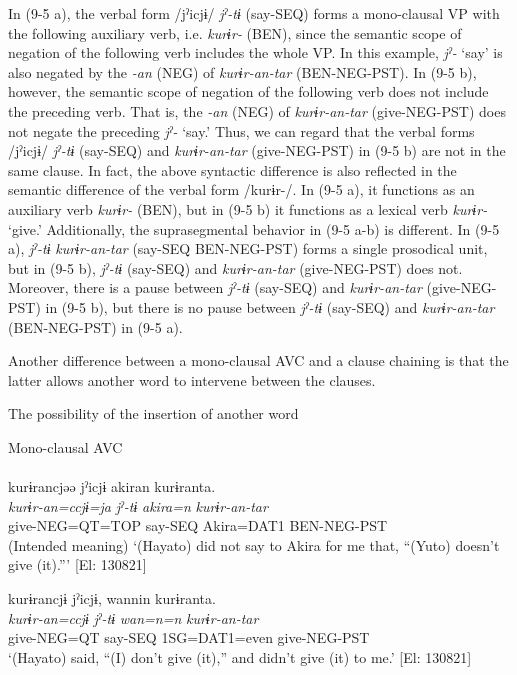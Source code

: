 In (9-5 a), the verbal form /jˀicjɨ/ \textit{jˀ-tɨ} (say-SEQ) forms a mono-clausal VP with the following auxiliary verb, i.e. \textit{kurɨr-} (BEN), since the semantic scope of negation of the following verb includes the whole VP. In this example, \textit{jˀ-} ‘say’ is also negated by the \textit{{}-an} (NEG) of \textit{kurɨr-an-tar} (BEN-NEG-PST). In (9-5 b), however, the semantic scope of negation of the following verb does not include the preceding verb. That is, the \textit{{}-an} (NEG) of \textit{kurɨr-an-tar} (give-NEG-PST) does not negate the preceding \textit{jˀ-} ‘say.’ Thus, we can regard that the verbal forms /jˀicjɨ/ \textit{jˀ-tɨ} (say-SEQ) and \textit{kurɨr-an-tar} (give-NEG-PST) in (9-5 b) are not in the same clause. In fact, the above syntactic difference is also reflected in the semantic difference of the verbal form /kurɨr-/. In (9-5 a), it functions as an auxiliary verb \textit{kurɨr-} (BEN), but in (9-5 b) it functions as a lexical verb \textit{kurɨr-} ‘give.’ Additionally, the suprasegmental behavior in (9-5 a-b) is different. In (9-5 a), \textit{jˀ-tɨ} \textit{kurɨr-an-tar} (say-SEQ BEN-NEG-PST) forms a single prosodical unit, but in (9-5 b), \textit{jˀ-tɨ} (say-SEQ) and \textit{kurɨr-an-tar} (give-NEG-PST) does not. Moreover, there is a pause between \textit{jˀ-tɨ} (say-SEQ) and \textit{kurɨr-an-tar} (give-NEG-PST) in (9-5 b), but there is no pause between \textit{jˀ-tɨ} (say-SEQ) and \textit{kurɨr-an-tar} (BEN-NEG-PST) in (9-5 a).

Another difference between a mono-clausal AVC and a clause chaining is that the latter allows another word to intervene between the clauses.

\ea   The possibility of the insertion of another word \label{ex:9.6}

  \ea \label{ex:9.6a}Mono-clausal AVC\\\\
 \glll  *kurɨrancjəə  jˀicjɨ  akiran  kurɨranta.\\
    \textit{kurɨr-an=ccjɨ=ja}  \textit{jˀ-tɨ}  \textit{akira=n}  \textit{kurɨr-an-tar}\\
    give-NEG=QT=TOP  say-SEQ  Akira=DAT1  BEN-NEG-PST\\
    \glt     (Intended meaning) ‘(Hayato) did not say to Akira for me that, “(Yuto) doesn’t give (it).”’ [El: 130821]

  \ex\label{ex:9.6b}

 \glll  kurɨrancjɨ  jˀicjɨ,  wannin  kurɨranta.\\
    \textit{kurɨr-an=ccjɨ}  \textit{jˀ-tɨ}  \textit{wan=n=n}  \textit{kurɨr-an-tar}\\
    give-NEG=QT  say-SEQ  1SG=DAT1=even  give-NEG-PST\\
    \glt     ‘(Hayato) said, “(I) don’t give (it),” and didn’t give (it) to me.’ [El: 130821]
    \z
\z


